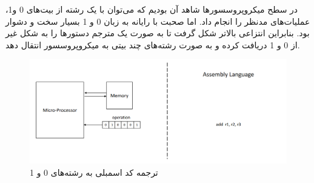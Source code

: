 \begin{flushright}
    در سطح میکروپروسسورها شاهد آن بودیم که می‌توان با یک رشته از بیت‌های 0 و1، عملیات‌های مدنظر را انجام داد.
    اما صحبت با رایانه به زبان 0 و 1 بسیار سخت و دشوار بود.
    بنابراین انتزاعی بالاتر شکل گرفت تا به صورت یک مترجم دستورها را به شکل غیر از 0 و 1 دریافت کرده و به صورت رشته‌های چند بیتی به میکروپروسسور انتقال دهد.

    \begin{figure}[H]
               \centering
               \includegraphics[scale=0.4]{source/assembly-imp&abs}
               \caption{ترجمه کد اسمبلی به رشته‌های 0 و 1}
               \label{fig:assembly-imp&abs}
    \end{figure}
\end{flushright}